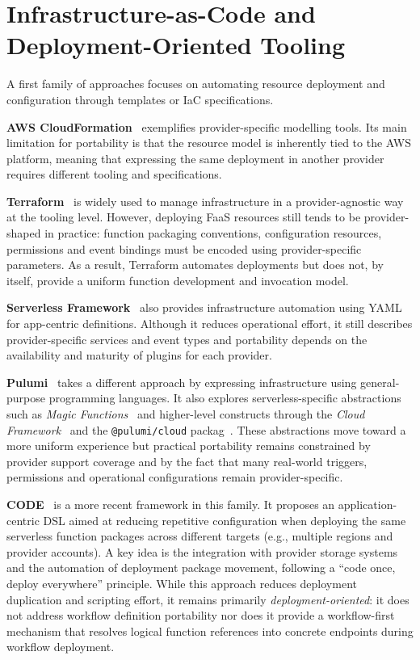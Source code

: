 \section{Infrastructure-as-Code and Deployment-Oriented Tooling}

A first family of approaches focuses on automating resource deployment and configuration through templates or IaC specifications.

\textbf{AWS CloudFormation}~\cite{awsCloudFormation} exemplifies provider-specific modelling tools. Its main limitation for portability is that the resource model is inherently tied to the AWS platform, meaning that expressing the same deployment in another provider requires different tooling and specifications.

\textbf{Terraform}~\cite{terraform} is widely used to manage infrastructure in a provider-agnostic way at the tooling level. However, deploying FaaS resources still tends to be provider-shaped in practice: function packaging conventions, configuration resources, permissions and event bindings must be encoded using provider-specific parameters. As a result, Terraform automates deployments but does not, by itself, provide a uniform function development and invocation model.

\textbf{Serverless Framework}~\cite{serverlessFramework} also provides infrastructure automation using YAML for app-centric definitions. Although it reduces operational effort, it still describes provider-specific services and event types and portability depends on the availability and maturity of plugins for each provider.

\textbf{Pulumi}~\cite{pulumi} takes a different approach by expressing infrastructure using general-purpose programming languages. It also explores serverless-specific abstractions such as \textit{Magic Functions}~\cite{pulumiMagicFunctions} and higher-level constructs through the \textit{Cloud Framework}~\cite{pulumiCloudFramework} and the \texttt{@pulumi/cloud} packag~\cite{pulumiCloudPkg}. These abstractions move toward a more uniform experience but practical portability remains constrained by provider support coverage and by the fact that many real-world triggers, permissions and operational configurations remain provider-specific.

\textbf{CODE}~\cite{ristov2024code} is a more recent framework in this family. It proposes an application-centric DSL aimed at reducing repetitive configuration when deploying the same serverless function packages across different targets (e.g., multiple regions and provider accounts). A key idea is the integration with provider storage systems and the automation of deployment package movement, following a ``code once, deploy everywhere'' principle. While this approach reduces deployment duplication and scripting effort, it remains primarily \textit{deployment-oriented}: it does not address workflow definition portability nor does it provide a workflow-first mechanism that resolves logical function references into concrete endpoints during workflow deployment.

